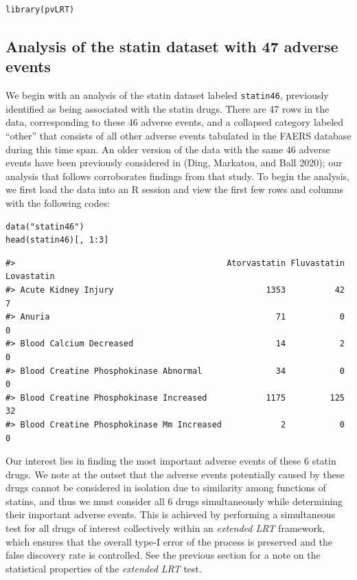\begin{verbatim}
library(pvLRT)
\end{verbatim}

\hypertarget{analysis-of-the-statin-dataset-with-47-adverse-events}{%
\subsection{Analysis of the statin dataset with 47 adverse events}\label{analysis-of-the-statin-dataset-with-47-adverse-events}}

We begin with an analysis of the statin dataset labeled \texttt{statin46}, previously identified as being associated with the statin drugs. There are 47 rows in the data, corresponding to these 46 adverse events, and a collapsed category labeled ``other'' that consists of all other adverse events tabulated in the FAERS database during this time span. An older version of the data with the same 46 adverse events have been previously considered in (Ding, Markatou, and Ball 2020); our analysis that follows corroborates findings from that study. To begin the analysis, we first load the data into an R session and view the first few rows and columns with the following codes:

\begin{verbatim}
data("statin46")
head(statin46)[, 1:3]
\end{verbatim}

\begin{verbatim}
#>                                           Atorvastatin Fluvastatin Lovastatin
#> Acute Kidney Injury                               1353          42          7
#> Anuria                                              71           0          0
#> Blood Calcium Decreased                             14           2          0
#> Blood Creatine Phosphokinase Abnormal               34           0          0
#> Blood Creatine Phosphokinase Increased            1175         125         32
#> Blood Creatine Phosphokinase Mm Increased            2           0          0
\end{verbatim}

Our interest lies in finding the most important adverse events of these 6 statin drugs. We note at the outset that the adverse events potentially caused by these drugs cannot be considered in isolation due to similarity among functions of statins, and thus we must consider all 6 drugs simultaneously while determining their important adverse events. This is achieved by performing a simultaneous test for all drugs of interest collectively within an \emph{extended LRT} framework, which ensures that the overall type-I error of the process is preserved and the false discovery rate is controlled. See the previous section for a note on the statistical properties of the \emph{extended LRT} test.

